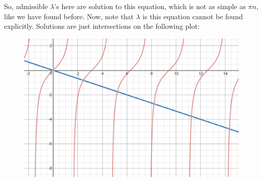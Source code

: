 \documentclass{book}
\theoremstyle{definition}
\begin{document}
So, admissible $\lambda$'s here are solution to this equation, which is not as simple as $\pi n$, like we have found before. Now, note that $\lambda$ is this equation cannot be found explicitly. Solutions are just intersections on the following plot:
\begin{figure}[h!]
	\centering
	\includegraphics[scale=0.6]{tan.png}
\end{figure}
\end{document}
